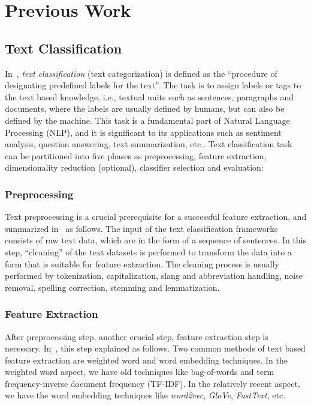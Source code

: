 \section{Previous Work}
\subsection{Text Classification}\label{sec:TC}
In~\autocite{li20tc}, \emph{text classification} (text categorization) is defined as the ``procedure of designating predefined labels for the text''. The task is to assign labels or tags to the text based knowledge, i.e., textual units such as sentences, paragraphs and documents, where the labels are usually defined by humans, but can also be defined by the machine. This task is a fundamental part of Natural Language Processing (NLP), and it is significant to its applications such as sentiment analysis, question answering, text summarization, etc.. Text classification task can be partitioned into five phases as preprocessing, feature extraction, dimensionality reduction (optional), classifier selection and evaluation:

\subsubsection{Preprocessing}
Text preprocessing is a crucial prerequisite for a successful feature extraction, and summarized in~\autocite{kowsari19tc} as follows. The input of the text classification frameworks consists of raw text data, which are in the form of a sequence of sentences. In this step, ``cleaning'' of the text datasets is performed to transform the data into a form that is suitable for feature extraction. The cleaning process is usually performed by tokenization, capitalization, slang and abbreviation handling, noise removal, spelling correction, stemming and lemmatization.

\subsubsection{Feature Extraction}
After preprocessing step, another crucial step, feature extraction step is necessary. In~\autocite{kowsari19tc}, this step explained as follows. Two common methods of text based feature extraction are weighted word and word embedding techniques. In the weighted word aspect, we have old techniques like bag-of-words and term frequency-inverse document frequency (TF-IDF). In the relatively recent aspect, we have the word embedding techniques like \emph{word2vec}, \emph{GloVe}, \emph{FastText}, etc.

